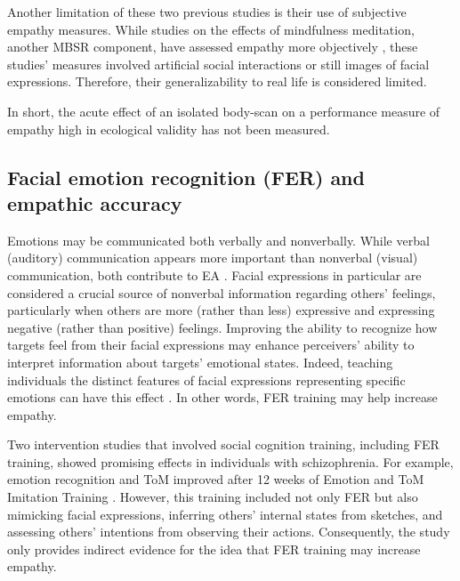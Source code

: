 \documentclass[authordate, empirical]{jote-new-article}
\begin{document}
	Another limitation of these two previous studies is their use of subjective empathy measures. While studies on the effects of mindfulness meditation, another MBSR component, have assessed empathy more objectively \parencites[e.g.,][]{Mascaro2013}, these studies' measures involved artificial social interactions or still images of facial expressions. Therefore, their generalizability to real life is considered limited.



	In short, the acute effect of an isolated body-scan on a performance measure of empathy high in ecological validity has not been measured.



	\subsection{Facial emotion recognition (FER) and empathic accuracy}



	Emotions may be communicated both verbally and nonverbally. While verbal (auditory) communication appears more important than nonverbal (visual) communication, both contribute to EA \parencites{Zaki2009}. Facial expressions in particular are considered a crucial source of nonverbal information regarding others' feelings, particularly when others are more (rather than less) expressive and expressing negative (rather than positive) feelings. Improving the ability to recognize how targets feel from their facial expressions may enhance perceivers' ability to interpret information about targets' emotional states. Indeed, teaching individuals the distinct features of facial expressions representing specific emotions can have this effect \parencites{Beitel2005}. In other words, FER training may help increase empathy.



	Two intervention studies that involved social cognition training, including FER training, showed promising effects in individuals with schizophrenia. For example, emotion recognition and ToM improved after 12 weeks of Emotion and ToM Imitation Training \parencites{Mazza2010}. However, this training included not only FER but also mimicking facial expressions, inferring others' internal states from sketches, and assessing others' intentions from observing their actions. Consequently, the study only provides indirect evidence for the idea that FER training may increase empathy.
\end{document}
